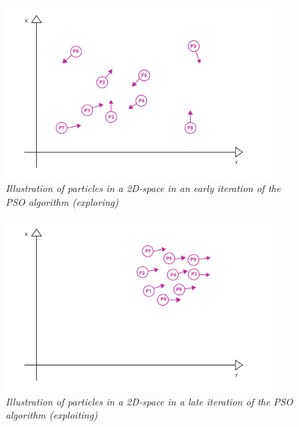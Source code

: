 \begin{figure}[h!]
  \centering
  \includegraphics[width=4in]{assets/pso_diagram1.pdf}
  \caption{\textit{Illustration of particles in a 2D-space in an early iteration of the PSO algorithm (exploring)}}
   \label{fig:psoBeginning}
\end{figure}

\begin{figure}[h!]
  \centering
  \includegraphics[width=4in]{assets/pso_diagram2.pdf}
  \caption{\textit{Illustration of particles in a 2D-space in a late iteration of the PSO algorithm (exploiting)}}
   \label{fig:psoEnd}
\end{figure}




